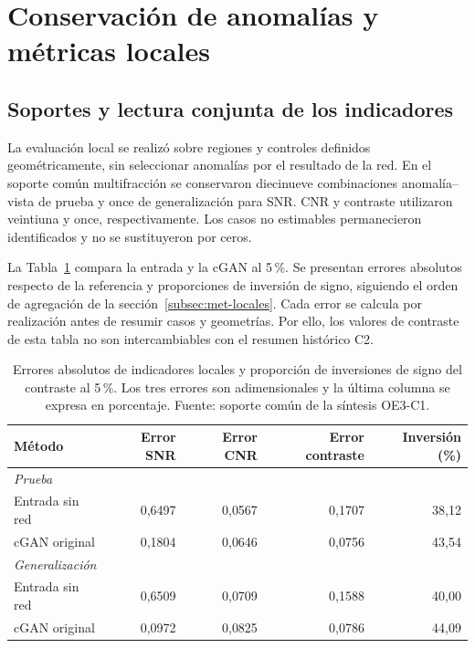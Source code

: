 \section{Conservación de anomalías y métricas locales}\label{sec:res-locales}
\subsection{Soportes y lectura conjunta de los indicadores}
La evaluación local se realizó sobre regiones y controles definidos geométricamente, sin seleccionar anomalías por el resultado de la red. En el soporte común multifracción se conservaron diecinueve combinaciones anomalía--vista de prueba y once de generalización para SNR. CNR y contraste utilizaron veintiuna y once, respectivamente. Los casos no estimables permanecieron identificados y no se sustituyeron por ceros.

La Tabla~\ref{tab:res-locales} compara la entrada y la cGAN al 5\,\%. Se presentan errores absolutos respecto de la referencia y proporciones de inversión de signo, siguiendo el orden de agregación de la sección~\ref{subsec:met-locales}. Cada error se calcula por realización antes de resumir casos y geometrías. Por ello, los valores de contraste de esta tabla no son intercambiables con el resumen histórico C2.
\begin{table}[htbp]\centering\small
\caption[Errores locales de entrada y cGAN al 5\,\%]{Errores absolutos de indicadores locales y proporción de inversiones de signo del contraste al 5\,\%. Los tres errores son adimensionales y la última columna se expresa en porcentaje. Fuente: soporte común de la síntesis OE3-C1.}\label{tab:res-locales}
\begin{tabular}{@{}lrrrr@{}}\toprule
Método & Error SNR & Error CNR & Error contraste & Inversión (\%)\\\midrule
\multicolumn{5}{l}{\textit{Prueba}}\\
Entrada sin red & 0{,}6497 & 0{,}0567 & 0{,}1707 & 38{,}12\\
cGAN original & 0{,}1804 & 0{,}0646 & 0{,}0756 & 43{,}54\\
\midrule
\multicolumn{5}{l}{\textit{Generalización}}\\
Entrada sin red & 0{,}6509 & 0{,}0709 & 0{,}1588 & 40{,}00\\
cGAN original & 0{,}0972 & 0{,}0825 & 0{,}0786 & 44{,}09\\
\bottomrule\end{tabular}\end{table}

